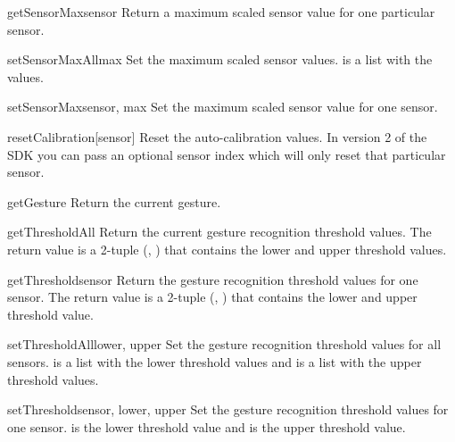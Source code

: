 \begin{methoddesc}{getSensorMax}{sensor}
Return a maximum scaled sensor value for one particular sensor.
\end{methoddesc}

\begin{methoddesc}{setSensorMaxAll}{max}
Set the maximum scaled sensor values.  is a list with the values.
\end{methoddesc}

\begin{methoddesc}{setSensorMax}{sensor, max}
Set the maximum scaled sensor value for one sensor.
\end{methoddesc}

\begin{methoddesc}{resetCalibration}{[sensor]}
Reset the auto-calibration values. In version 2 of the SDK you can pass
an optional sensor index which will only reset that particular sensor.
\end{methoddesc}

\begin{methoddesc}{getGesture}{}
Return the current gesture.
\end{methoddesc}

\begin{methoddesc}{getThresholdAll}{}
Return the current gesture recognition threshold values. The return
value is a 2-tuple (, ) that contains the lower
and upper threshold values.
\end{methoddesc}

\begin{methoddesc}{getThreshold}{sensor}
Return the gesture recognition threshold values for one sensor. The return
value is a 2-tuple (, ) that contains the lower
and upper threshold value.
\end{methoddesc}

\begin{methoddesc}{setThresholdAll}{lower, upper}
Set the gesture recognition threshold values for all sensors. 
is a list with the lower threshold values and  is a list with
the upper threshold values.
\end{methoddesc}

\begin{methoddesc}{setThreshold}{sensor, lower, upper}
Set the gesture recognition threshold values for one sensor. 
is the lower threshold value and  is the upper threshold value.
\end{methoddesc}

